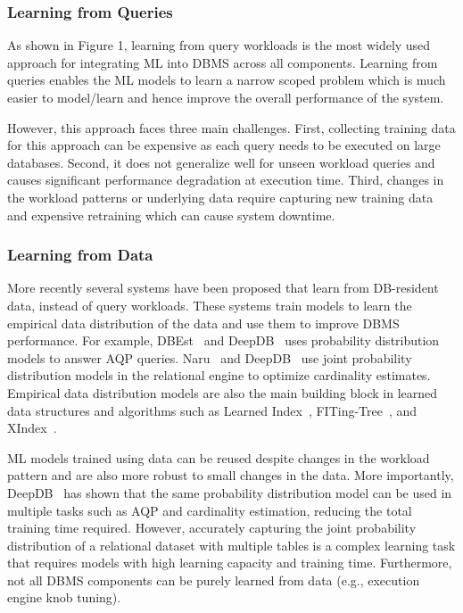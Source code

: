 \subsubsection{Learning from Queries} As shown in Figure 1, learning from query workloads is the most widely used approach for integrating ML into DBMS across all components.
Learning from queries enables the ML models to learn a narrow scoped problem which is much easier to model/learn and hence improve the overall performance of the system.

However, this approach faces three main challenges.
First, collecting training data for this approach can be expensive as each query needs to be executed on large databases.
Second, it does not generalize well for unseen workload queries and causes significant performance degradation at execution time.
Third, changes in the workload patterns or underlying data require capturing new training data and expensive retraining which can cause system downtime.

\subsubsection{Learning from Data} More recently several systems have been proposed that learn from DB-resident data, instead of query workloads.
These systems train models to learn the empirical data distribution of the data and use them to improve DBMS performance.
For example, DBEst~\cite{dbest} and DeepDB~\cite{deepdb} uses probability distribution models to answer AQP queries.
Naru~\cite{naru} and DeepDB~\cite{deepdb} use joint probability distribution models in the relational engine to optimize cardinality estimates.
Empirical data distribution models are also the main building block in learned data structures and algorithms such as Learned Index~\cite{learnedindex}, FITing-Tree~\cite{fitingtree}, and XIndex~\cite{xindex}.

ML models trained using data can be reused despite changes in the workload pattern and are also more robust to small changes in the data.
More importantly, DeepDB~\cite{deepdb} has shown that the same probability distribution model can be used in multiple tasks such as AQP and cardinality estimation, reducing the total training time required.
However, accurately capturing the joint probability distribution of a relational dataset with multiple tables is a complex learning task that requires models with high learning capacity and training time.
Furthermore, not all DBMS components can be purely learned from data (e.g., execution engine knob tuning).


